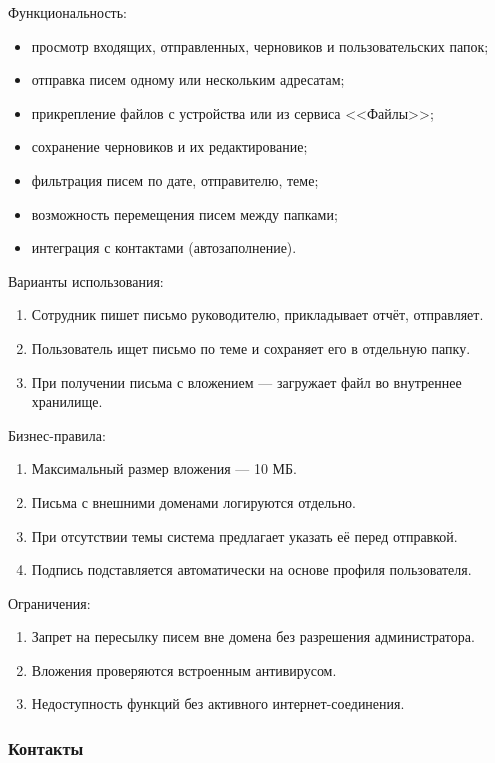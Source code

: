 Функциональность:
\begin{itemize}
  \item просмотр входящих, отправленных, черновиков и пользовательских папок;
  \item отправка писем одному или нескольким адресатам;
  \item прикрепление файлов с устройства или из сервиса <<Файлы>>;
  \item сохранение черновиков и их редактирование;
  \item фильтрация писем по дате, отправителю, теме;
  \item возможность перемещения писем между папками;
  \item интеграция с контактами (автозаполнение).
\end{itemize}

Варианты использования:
\begin{enumerate}
  \item Сотрудник пишет письмо руководителю, прикладывает отчёт, отправляет.
  \item Пользователь ищет письмо по теме и сохраняет его в отдельную папку.
  \item При получении письма с вложением — загружает файл во внутреннее хранилище.
\end{enumerate}

Бизнес-правила:
\begin{enumerate}
  \item Максимальный размер вложения — 10 МБ.
  \item Письма с внешними доменами логируются отдельно.
  \item При отсутствии темы система предлагает указать её перед отправкой.
  \item Подпись подставляется автоматически на основе профиля пользователя.
\end{enumerate}

Ограничения:
\begin{enumerate}
  \item Запрет на пересылку писем вне домена без разрешения администратора.
  \item Вложения проверяются встроенным антивирусом.
  \item Недоступность функций без активного интернет-соединения.
\end{enumerate}

\subsubsection{Контакты}

